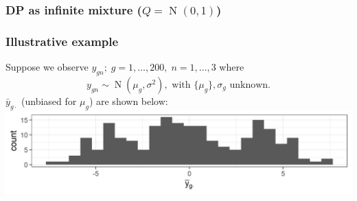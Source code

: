 \documentclass{beamer}
\newcommand{\op}{\operatorname}
\begin{document}
\begin{frame}[label=current]
\frametitle{DP as infinite mixture ($Q=\op{N}(0,1)$)}
\end{frame}

\begin{frame}[label=current]
\frametitle{Illustrative example}
{\small Suppose we observe $y_{gn};\; g=1,\ldots,200,\; n=1,\ldots,3$ where\\
    \pause\[ y_{gn} \sim \op{N}(\mu_g,\sigma^2),\mbox{ with }\{\mu_g\},\sigma_g\mbox{ unknown.}\]
 \pause $\bar{y}_{g\cdot}$ (unbiased for $\mu_g$) are shown below:\\
 {\centering \includegraphics[width=.9\textwidth]{samplemeans_ie}}
}
 
\end{frame}
\end{document}
